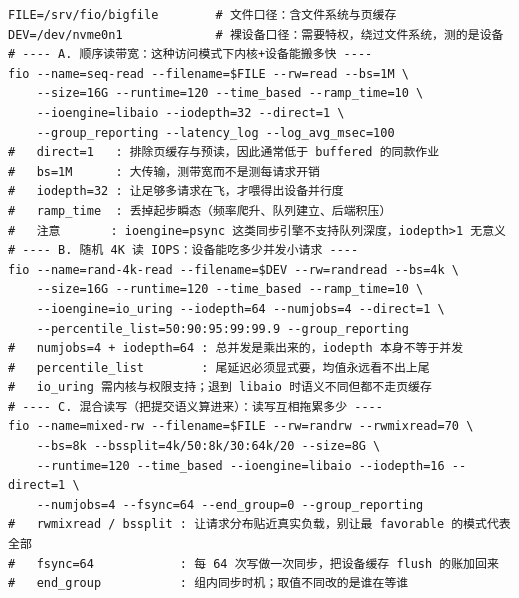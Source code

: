 \documentclass[12pt,a4paper,fontset=fandol]{ctexbook}
\begin{document}
\begin{lstlisting}[style=shellstyle,caption={三组典型作业骨架：每段注明它测的是哪一段账（路径与设备请自己替换）},label={lst:pm08-fio-jobs}]
FILE=/srv/fio/bigfile        # 文件口径：含文件系统与页缓存
DEV=/dev/nvme0n1             # 裸设备口径：需要特权，绕过文件系统，测的是设备
# ---- A. 顺序读带宽：这种访问模式下内核+设备能搬多快 ----
fio --name=seq-read --filename=$FILE --rw=read --bs=1M \
    --size=16G --runtime=120 --time_based --ramp_time=10 \
    --ioengine=libaio --iodepth=32 --direct=1 \
    --group_reporting --latency_log --log_avg_msec=100
#   direct=1   : 排除页缓存与预读，因此通常低于 buffered 的同款作业
#   bs=1M      : 大传输，测带宽而不是测每请求开销
#   iodepth=32 : 让足够多请求在飞，才喂得出设备并行度
#   ramp_time  : 丢掉起步瞬态（频率爬升、队列建立、后端积压）
#   注意       : ioengine=psync 这类同步引擎不支持队列深度，iodepth>1 无意义
# ---- B. 随机 4K 读 IOPS：设备能吃多少并发小请求 ----
fio --name=rand-4k-read --filename=$DEV --rw=randread --bs=4k \
    --size=16G --runtime=120 --time_based --ramp_time=10 \
    --ioengine=io_uring --iodepth=64 --numjobs=4 --direct=1 \
    --percentile_list=50:90:95:99:99.9 --group_reporting
#   numjobs=4 + iodepth=64 : 总并发是乘出来的，iodepth 本身不等于并发
#   percentile_list        : 尾延迟必须显式要，均值永远看不出上尾
#   io_uring 需内核与权限支持；退到 libaio 时语义不同但都不走页缓存
# ---- C. 混合读写（把提交语义算进来）：读写互相拖累多少 ----
fio --name=mixed-rw --filename=$FILE --rw=randrw --rwmixread=70 \
    --bs=8k --bssplit=4k/50:8k/30:64k/20 --size=8G \
    --runtime=120 --time_based --ioengine=libaio --iodepth=16 --direct=1 \
    --numjobs=4 --fsync=64 --end_group=0 --group_reporting
#   rwmixread / bssplit : 让请求分布贴近真实负载，别让最 favorable 的模式代表全部
#   fsync=64            : 每 64 次写做一次同步，把设备缓存 flush 的账加回来
#   end_group           : 组内同步时机；取值不同改的是谁在等谁
\end{lstlisting}
\end{document}
